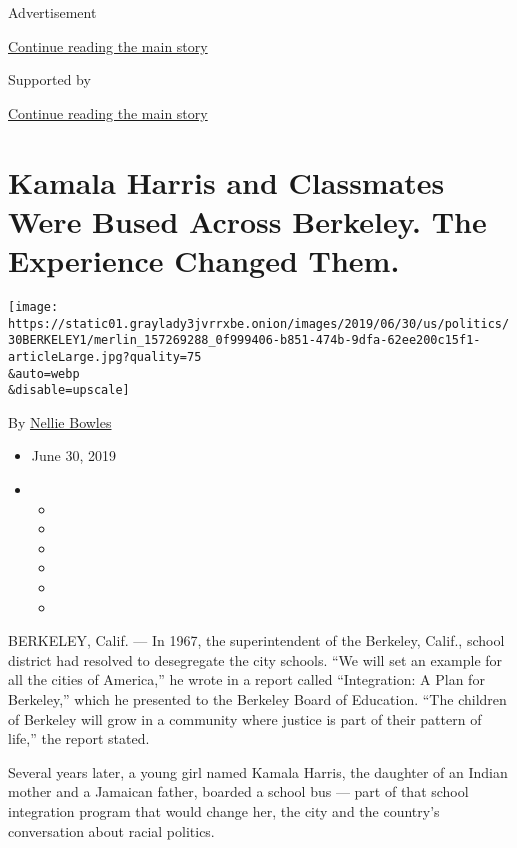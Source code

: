 Advertisement

\protect\hyperlink{after-top}{Continue reading the main story}

Supported by

\protect\hyperlink{after-sponsor}{Continue reading the main story}

\hypertarget{kamala-harris-and-classmates-were-bused-across-berkeley-the-experience-changed-them}{%
\section{Kamala Harris and Classmates Were Bused Across Berkeley. The
Experience Changed
Them.}\label{kamala-harris-and-classmates-were-bused-across-berkeley-the-experience-changed-them}}

\texttt{[image: https://static01.graylady3jvrrxbe.onion/images/2019/06/30/us/politics/30BERKELEY1/merlin\_157269288\_0f999406-b851-474b-9dfa-62ee200c15f1-articleLarge.jpg?quality=75\\\&auto=webp\\\&disable=upscale]}

By \href{https://www.nytimes3xbfgragh.onion/by/nellie-bowles}{Nellie
Bowles}

\begin{itemize}
\item
  June 30, 2019
\item
  \begin{itemize}
  \item
  \item
  \item
  \item
  \item
  \item
  \end{itemize}
\end{itemize}

BERKELEY, Calif. --- In 1967, the superintendent of the Berkeley,
Calif., school district had resolved to desegregate the city schools.
``We will set an example for all the cities of America,'' he wrote in a
report called ``Integration: A Plan for Berkeley,'' which he presented
to the Berkeley Board of Education. ``The children of Berkeley will grow
in a community where justice is part of their pattern of life,'' the
report stated.

Several years later, a young girl named Kamala Harris, the daughter of
an Indian mother and a Jamaican father, boarded a school bus --- part of
that school integration program that would change her, the city and the
country's conversation about racial politics.

